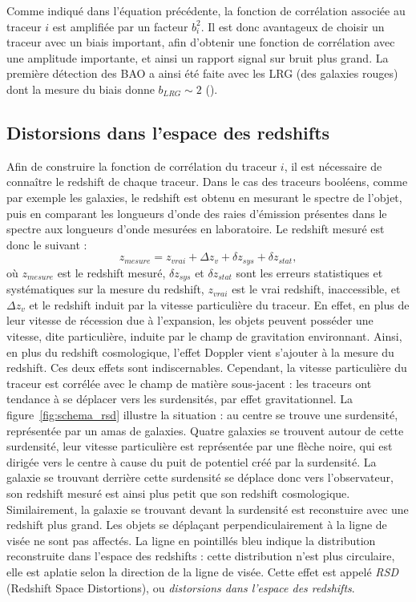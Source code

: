 \documentclass[11pt, twoside, a4paper, openright]{report}
\begin{document}
Comme indiqué dans l'équation précédente, la fonction de corrélation associée au traceur $i$ est amplifiée par un facteur $b_{i}^2$.
Il est donc avantageux de choisir un traceur avec un biais important, afin d'obtenir une fonction de corrélation avec une amplitude importante, et ainsi un rapport signal sur bruit plus grand. La première détection des BAO a ainsi été faite avec les LRG (des galaxies rouges) dont la mesure du biais donne $b_{LRG} \sim 2$ (\cite{eisenstein_detection_2005}).

\subsection{Distorsions dans l'espace des redshifts}
Afin de construire la fonction de corrélation du traceur $i$, il est nécessaire de connaître le redshift de chaque traceur. Dans le cas des traceurs booléens, comme par exemple les galaxies, le redshift est obtenu en mesurant le spectre de l'objet, puis en comparant les longueurs d'onde des raies d'émission présentes dans le spectre aux longueurs d'onde mesurées en laboratoire. Le redshift mesuré est donc le suivant :
\begin{equation}
  z_{mesure} = z_{vrai} + \Delta z_{v} + \delta z_{sys} + \delta z_{stat} ,
\end{equation}
où $z_{mesure}$ est le redshift mesuré, $\delta z_{sys}$ et $\delta z_{stat}$ sont les erreurs statistiques et systématiques sur la mesure du redshift, $z_{vrai}$ est le vrai redshift, inaccessible, et $\Delta z_{v}$ et le redshift induit par la vitesse particulière du traceur.
En effet, en plus de leur vitesse de récession due à l'expansion, les objets peuvent posséder une vitesse, dite particulière, induite par le champ de gravitation environnant. 
Ainsi, en plus du redshift cosmologique, l'effet Doppler vient s'ajouter à la mesure du redshift.
Ces deux effets sont indiscernables. Cependant, la vitesse particulière du traceur est corrélée avec le champ de matière sous-jacent : les traceurs ont tendance à se déplacer vers les surdensités, par effet gravitationnel. La figure~\ref{fig:schema_rsd} illustre la situation : au centre se trouve une surdensité, représentée par un amas de galaxies. Quatre galaxies se trouvent autour de cette surdensité, leur vitesse particulière est représentée par une flèche noire, qui est dirigée vers le centre à cause du puit de potentiel créé par la surdensité. La galaxie se trouvant derrière cette surdensité se déplace donc vers l'observateur, son redshift mesuré est ainsi plus petit que son redshift cosmologique. Similairement, la galaxie se trouvant devant la surdensité est reconstuire avec une redshift plus grand. Les objets se déplaçant perpendiculairement à la ligne de visée ne sont pas affectés. La ligne en pointillés bleu indique la distribution reconstruite dans l'espace des redshifts : cette distribution n'est plus circulaire, elle est aplatie selon la direction de la ligne de visée. Cette effet est appelé \emph{RSD} (Redshift Space Distortions), ou \emph{distorsions dans l'espace des redshifts}.
\end{document}
